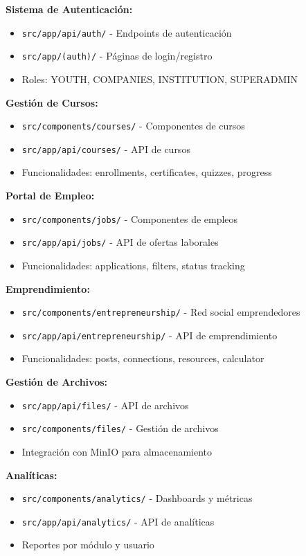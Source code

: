 \documentclass[12pt,a4paper]{article}
\begin{document}
\textbf{Sistema de Autenticación:}
\begin{itemize}
    \item \texttt{src/app/api/auth/} - Endpoints de autenticación
    \item \texttt{src/app/(auth)/} - Páginas de login/registro
    \item Roles: YOUTH, COMPANIES, INSTITUTION, SUPERADMIN
\end{itemize}

\textbf{Gestión de Cursos:}
\begin{itemize}
    \item \texttt{src/components/courses/} - Componentes de cursos
    \item \texttt{src/app/api/courses/} - API de cursos
    \item Funcionalidades: enrollments, certificates, quizzes, progress
\end{itemize}

\textbf{Portal de Empleo:}
\begin{itemize}
    \item \texttt{src/components/jobs/} - Componentes de empleos
    \item \texttt{src/app/api/jobs/} - API de ofertas laborales
    \item Funcionalidades: applications, filters, status tracking
\end{itemize}

\textbf{Emprendimiento:}
\begin{itemize}
    \item \texttt{src/components/entrepreneurship/} - Red social emprendedores
    \item \texttt{src/app/api/entrepreneurship/} - API de emprendimiento
    \item Funcionalidades: posts, connections, resources, calculator
\end{itemize}

\textbf{Gestión de Archivos:}
\begin{itemize}
    \item \texttt{src/app/api/files/} - API de archivos
    \item \texttt{src/components/files/} - Gestión de archivos
    \item Integración con MinIO para almacenamiento
\end{itemize}

\textbf{Analíticas:}
\begin{itemize}
    \item \texttt{src/components/analytics/} - Dashboards y métricas
    \item \texttt{src/app/api/analytics/} - API de analíticas
    \item Reportes por módulo y usuario
\end{itemize}
\end{document}
